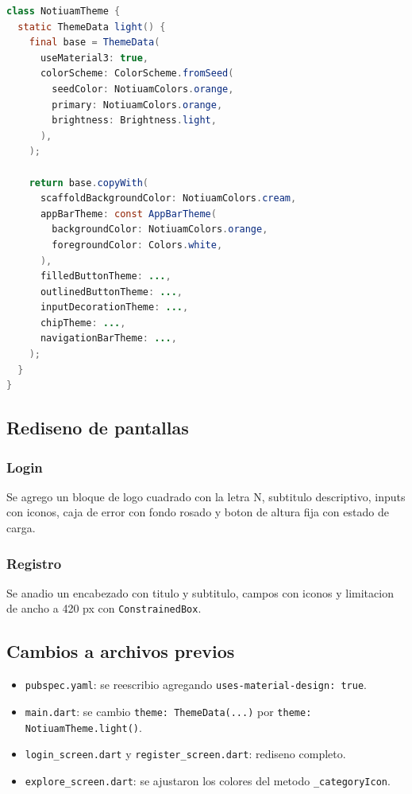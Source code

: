 \begin{lstlisting}[language=Java]
class NotiuamTheme {
  static ThemeData light() {
    final base = ThemeData(
      useMaterial3: true,
      colorScheme: ColorScheme.fromSeed(
        seedColor: NotiuamColors.orange,
        primary: NotiuamColors.orange,
        brightness: Brightness.light,
      ),
    );

    return base.copyWith(
      scaffoldBackgroundColor: NotiuamColors.cream,
      appBarTheme: const AppBarTheme(
        backgroundColor: NotiuamColors.orange,
        foregroundColor: Colors.white,
      ),
      filledButtonTheme: ...,
      outlinedButtonTheme: ...,
      inputDecorationTheme: ...,
      chipTheme: ...,
      navigationBarTheme: ...,
    );
  }
}
\end{lstlisting}

\subsection{Rediseno de pantallas}

\subsubsection{Login}

Se agrego un bloque de logo cuadrado con la letra N, subtitulo descriptivo, inputs con iconos, caja de error con fondo rosado y boton de altura fija con estado de carga.

\subsubsection{Registro}

Se anadio un encabezado con titulo y subtitulo, campos con iconos y limitacion de ancho a 420 px con \texttt{ConstrainedBox}.

\subsection{Cambios a archivos previos}

\begin{itemize}[leftmargin=*]
  \item \texttt{pubspec.yaml}: se reescribio agregando \texttt{uses-material-design: true}.
  \item \texttt{main.dart}: se cambio \texttt{theme: ThemeData(...)} por \texttt{theme: NotiuamTheme.light()}.
  \item \texttt{login\_screen.dart} y \texttt{register\_screen.dart}: rediseno completo.
  \item \texttt{explore\_screen.dart}: se ajustaron los colores del metodo \texttt{\_categoryIcon}.
\end{itemize}

